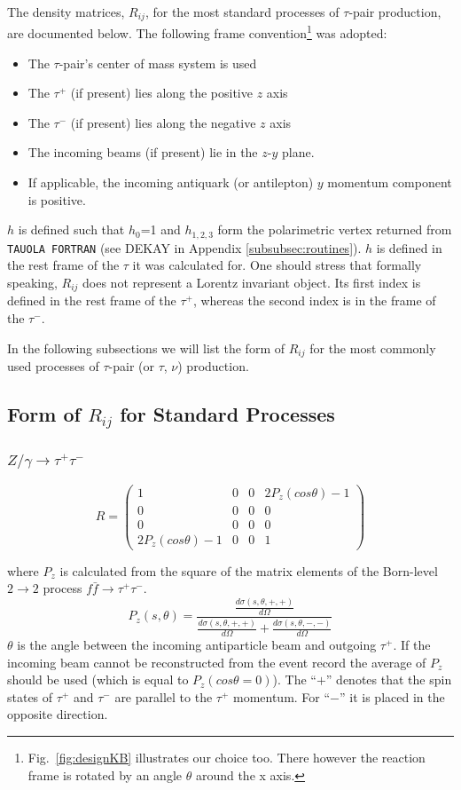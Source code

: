 \documentclass[]{Tauola_interface_design}
\begin{document}
The density matrices, $R_{ij}$, for the most standard
processes of $\tau$-pair production, are documented below.
The following frame 
convention\footnote{Fig.~\ref{fig:designKB} illustrates our choice too.
There however the reaction frame is rotated by an angle  $\theta$ around the x axis.} 
was adopted:
\begin{itemize}
  \item The $\tau$-pair's center of mass system  is used 
  \item The $\tau^{+}$ (if present) lies along the positive $z$ axis
  \item The $\tau^{-}$ (if present) lies along the negative $z$ axis
  \item The incoming beams (if present) lie in the $z$-$y$ plane.
  \item If applicable, the incoming antiquark (or antilepton) $y$ momentum component is positive.
\end{itemize}

$h$ is defined such that $h_0$=1 and $h_{1,2,3}$ form the polarimetric vertex
returned from {\tt TAUOLA FORTRAN} (see DEKAY in Appendix \ref{subsubsec:routines}).
$h$  is defined in the rest frame of the $\tau$ it 
was calculated for. One should stress that formally speaking,  $R_{ij}$
does not represent a Lorentz invariant object. Its first index is defined in the
rest frame of the $\tau^+$, whereas the second index 
is in the frame of the $\tau^-$.

In the following subsections we will list the form of $R_{ij}$ for the most 
commonly used processes of $\tau$-pair (or $\tau$, $\nu$) production.

\subsection{Form of $R_{ij}$ for Standard Processes}
\subsubsection{$Z/\gamma \rightarrow \tau^+ \tau^-$}
\label{subsubsection:z/gamma}

\[R=\begin{pmatrix} 
1 & 0 & 0 & 2P_z(cos\theta)-1 \\
0 & 0 & 0 & 0 \\
0 & 0 & 0 & 0 \\
2P_z(cos\theta)-1 & 0 & 0 & 1 
\end{pmatrix}\]

where $P_z$ is calculated from the square of the matrix elements of the 
Born-level $2 \rightarrow 2$ process $f \bar{f} \rightarrow \tau^+ \tau^-$.
\[P_z(s,\theta) = \frac{\frac{d\sigma(s,\theta,+,+)}{d\Omega}}{\frac{d\sigma(s,\theta,+,+)}{d\Omega}+\frac{d\sigma(s,\theta,-,-)}{d\Omega}} \]
$\theta$ is the angle between the incoming antiparticle beam and outgoing $\tau^+$. If the incoming beam 
cannot be reconstructed from the event record the average of $P_z$ should be used 
(which is equal to $P_z(cos\theta=0)$). The ``$+$'' denotes that 
the spin states of $\tau^+$ and $\tau^-$ are parallel to the $\tau^+$ momentum.
For ``$-$'' it is placed in the opposite direction.
\end{document}
